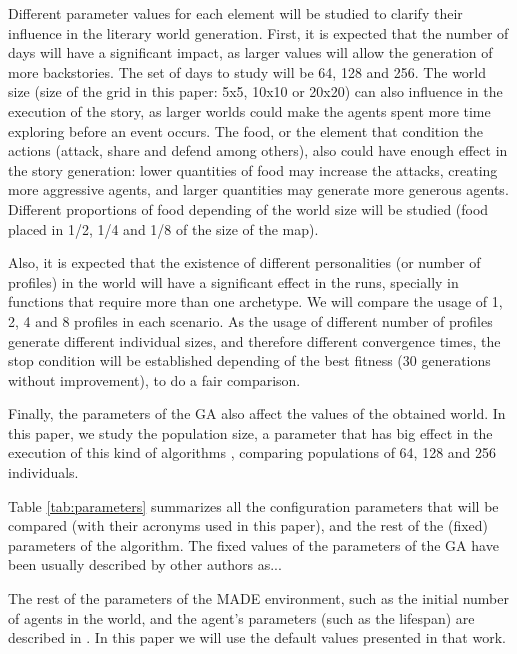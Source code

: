 \documentclass[runningheads,a4paper]{llncs}
\begin{document}

Different parameter values for each element will be studied to clarify their influence in the literary world generation. First, it is expected that the number of days will have a significant impact, as larger values will allow the generation of more backstories. The set of days to study will be 64, 128 and 256. The world size (size of the grid in this paper: 5x5, 10x10 or 20x20) can also influence in the execution of the story, as larger worlds could make the agents spent more time exploring before an event occurs. The food, or the element that condition the actions (attack, share and defend among others), also could have enough effect in the story generation: lower quantities of food may increase the attacks, creating more aggressive agents, and larger quantities may generate more generous agents. Different proportions of food depending of the world size will be studied (food placed in 1/2, 1/4 and 1/8 of the size of the map).

Also, it is expected that the existence of different personalities (or number of profiles) in the world will have a significant effect in the runs, specially in functions that require more than one archetype. We will compare the usage of 1, 2, 4 and 8 profiles in each scenario. As the usage of different number of profiles generate different
individual sizes, and therefore different convergence times, the stop
condition will be established depending of the best fitness (30 generations without improvement), to do a fair comparison.

Finally, the parameters of the GA also affect the values of the
obtained world. In this paper, we study the population size, a parameter that has big effect in the execution of this kind of algorithms \cite{}, comparing populations of 64, 128 and 256 individuals. %

Table \ref{tab:parameters} summarizes all the configuration parameters that will be compared (with their acronyms used in this paper), and the rest of the (fixed) parameters of the algorithm. The fixed values of the parameters of the GA have been usually described by other authors as...

The rest of the parameters of the MADE environment, such as the initial number of agents in the world, and the agent's parameters (such as the lifespan) are described in \cite{garcia14my}. In this paper we will use the default values presented in that work.
\end{document}
